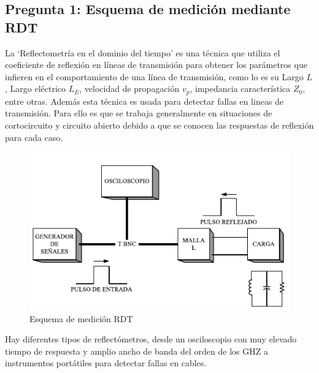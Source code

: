 \documentclass[11pt,onecolumn]{article}
\begin{document}
\subsection{Pregunta 1: Esquema de medición mediante RDT}

La `Reflectometría en el dominio del tiempo' es una técnica que  utiliza el coeficiente de reflexión en líneas de transmisión para obtener los parámetros que infieren en el comportamiento de una línea de transmisión, como lo es su Largo $L$, Largo eléctrico $L_{E}$, velocidad de propagación $v_{p}$, impedancia característica $Z_{0}$, entre otras. Además esta técnica es usada para detectar fallas en lineas de transmisión. Para ello es que se trabaja generalmente en situaciones de cortocircuito y circuito abierto debido a que se conocen las respuestas de reflexión para cada caso.

\begin{figure}
  \begin{center}
    \includegraphics[scale = 1]{img/schema.pdf}
  \end{center}
  \caption{Esquema de medición RDT}
  \label{fig:schrdt}
\end{figure}

Hay diferentes tipos de reflectómetros, desde un osciloscopio con muy elevado tiempo de respuesta y amplio ancho de banda del orden de los 
GHZ a instrumentos portátiles para detectar fallas en cables. 
\end{document}
